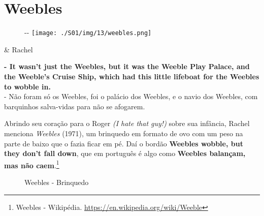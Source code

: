 \hypertarget{weebles}{%
\section{Weebles}\label{weebles}}

\begin{figure}[!ht]
  \begin{adjustwidth}{-\oddsidemargin-1in}{-\rightmargin}
    \centering
    \texttt{[image: ./S01/img/13/weebles.png]}
  \end{adjustwidth}
\end{figure}

\begin{tcolorbox}[enhanced,center upper,
    drop fuzzy shadow southeast, boxrule=0.3pt,
    lower separated=false, breakable,
    colframe=black!30!dialogoBorder,colback=white]
\begin{minipage}[c]{0.16\linewidth}
   & \centering \scriptsize{Rachel}
\end{minipage}
\hfill
\begin{minipage}[c]{0.8\linewidth}
  \textbf{- It wasn't just the Weebles, but it was the Weeble Play Palace, and the Weeble's Cruise Ship, which had this little lifeboat for the Weebles to wobble in.}\\
  - Não foram só os Weebles, foi o palácio dos Weebles, e o navio dos Weebles, com barquinhos salva-vidas para não se afogarem.
\end{minipage}
\end{tcolorbox}

Abrindo seu coração para o Roger \emph{(I hate that guy!)} sobre sua
infância, Rachel menciona \emph{Weebles} (1971), um brinquedo em formato
de ovo com um peso na parte de baixo que o fazia ficar em pé. Daí o
bordão \textbf{Weebles wobble, but they don't fall down}, que em
português é algo como \textbf{Weebles balançam, mas não
caem}.\footnote{\sloppy Weebles - Wikipédia. \url{https://en.wikipedia.org/wiki/Weeble}}

\begin{figure}
  \centering
    \caption{Weebles - Brinquedo\label{fig:weebles-brinquedo}}
\end{figure}

